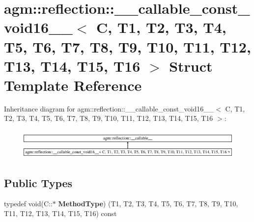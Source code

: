 \hypertarget{structagm_1_1reflection_1_1____callable__const__void16____}{}\section{agm\+:\+:reflection\+:\+:\+\_\+\+\_\+callable\+\_\+const\+\_\+void16\+\_\+\+\_\+$<$ C, T1, T2, T3, T4, T5, T6, T7, T8, T9, T10, T11, T12, T13, T14, T15, T16 $>$ Struct Template Reference}
\label{structagm_1_1reflection_1_1____callable__const__void16____}
Inheritance diagram for agm\+:\+:reflection\+:\+:\+\_\+\+\_\+callable\+\_\+const\+\_\+void16\+\_\+\+\_\+$<$ C, T1, T2, T3, T4, T5, T6, T7, T8, T9, T10, T11, T12, T13, T14, T15, T16 $>$\+:\begin{figure}[H]
\begin{center}
\leavevmode
\includegraphics[height=1.573034cm]{structagm_1_1reflection_1_1____callable__const__void16____}
\end{center}
\end{figure}
\subsection*{Public Types}
\begin{DoxyCompactItemize}
\item 
typedef void(C\+::$\ast$ {\bfseries Method\+Type}) (T1, T2, T3, T4, T5, T6, T7, T8, T9, T10, T11, T12, T13, T14, T15, T16) const \hypertarget{structagm_1_1reflection_1_1____callable__const__void16_____aa8c95929b05830e96575ac3d79cf53ac}{}\label{structagm_1_1reflection_1_1____callable__const__void16_____aa8c95929b05830e96575ac3d79cf53ac}

\end{DoxyCompactItemize}
